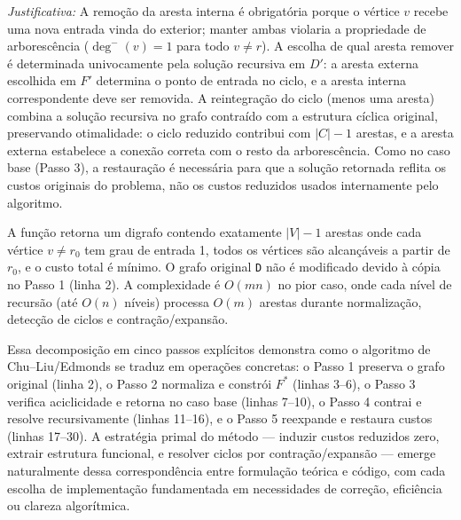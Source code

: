 \begin{tcolorbox}
    \emph{Justificativa:} A remoção da aresta interna é obrigatória porque o vértice \(v\) recebe uma nova entrada vinda do exterior; manter ambas violaria a propriedade de arborescência (\(\deg^-(v)=1\) para todo \(v\neq r\)). A escolha de qual aresta remover é determinada univocamente pela solução recursiva em \(D'\): a aresta externa escolhida em \(F'\) determina o ponto de entrada no ciclo, e a aresta interna correspondente deve ser removida. A reintegração do ciclo (menos uma aresta) combina a solução recursiva no grafo contraído com a estrutura cíclica original, preservando otimalidade: o ciclo reduzido contribui com \(|C|-1\) arestas, e a aresta externa estabelece a conexão correta com o resto da arborescência. Como no caso base (Passo 3), a restauração é necessária para que a solução retornada reflita os custos originais do problema, não os custos reduzidos usados internamente pelo algoritmo.
\end{tcolorbox}

A função retorna um digrafo contendo exatamente \(|V|-1\) arestas onde cada vértice \(v \neq r_0\) tem grau de entrada 1, todos os vértices são alcançáveis a partir de \(r_0\), e o custo total é mínimo. O grafo original \texttt{D} não é modificado devido à cópia no Passo 1 (linha 2). A complexidade é \(O(mn)\) no pior caso, onde cada nível de recursão (até \(O(n)\) níveis) processa \(O(m)\) arestas durante normalização, detecção de ciclos e contração/expansão.

Essa decomposição em cinco passos explícitos demonstra como o algoritmo de Chu–Liu/Edmonds se traduz em operações concretas: o Passo 1 preserva o grafo original (linha 2), o Passo 2 normaliza e constrói \(F^*\) (linhas 3--6), o Passo 3 verifica aciclicidade e retorna no caso base (linhas 7--10), o Passo 4 contrai e resolve recursivamente (linhas 11--16), e o Passo 5 reexpande e restaura custos (linhas 17--30). A estratégia primal do método — induzir custos reduzidos zero, extrair estrutura funcional, e resolver ciclos por contração/expansão — emerge naturalmente dessa correspondência entre formulação teórica e código, com cada escolha de implementação fundamentada em necessidades de correção, eficiência ou clareza algorítmica.

